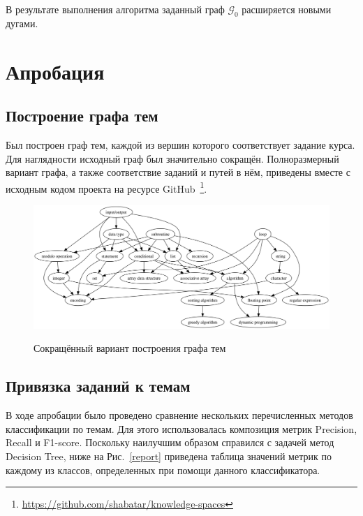 \documentclass[14pt]{matmex-diploma-custom}
\begin{document}
В результате выполнения алгоритма заданный граф $\mathcal{G_0}$ расширяется новыми дугами. %

\section{Апробация}

\subsection{Построение графа тем}
Был построен граф тем, каждой из вершин которого соответствует задание курса. Для наглядности исходный граф был значительно сокращён. Полноразмерный вариант графа, а также соответствие заданий и путей в нём, приведены вместе с исходным кодом проекта на ресурсе GitHub~\footnote{\url{https://github.com/shabatar/knowledge-spaces}}.
\begin{figure}[!htb]
\caption{Сокращённый вариант построения графа тем}
\hspace*{-2cm}\includegraphics[width=20cm]{themegraph}
\label{themegraph}
\end{figure}

\subsection{Привязка заданий к темам}
В ходе апробации было проведено сравнение нескольких перечисленных методов классификации по темам. Для этого использовалась композиция метрик Precision, Recall и F1-score. Поскольку наилучшим образом справился с задачей метод Decision Tree, ниже на Рис.~\ref{report} приведена таблица значений метрик по каждому из классов, определенных при помощи данного классификатора.
\end{document}
